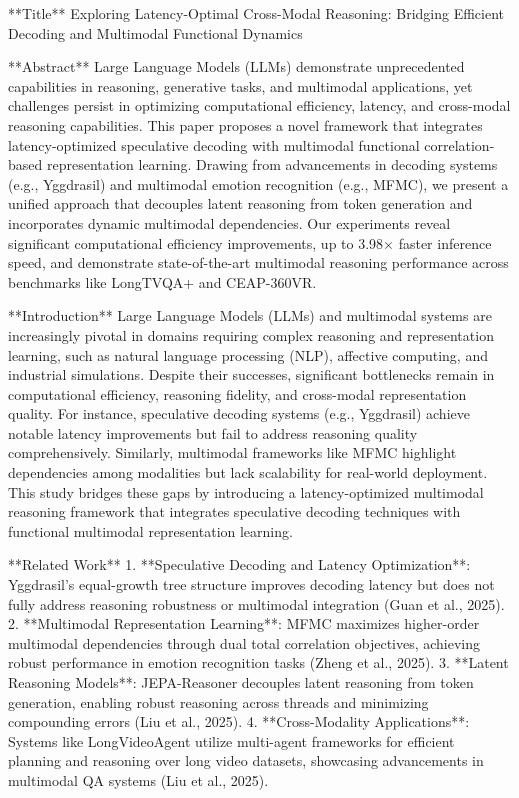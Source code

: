 **Title**  
Exploring Latency-Optimal Cross-Modal Reasoning: Bridging Efficient Decoding and Multimodal Functional Dynamics  

**Abstract**  
Large Language Models (LLMs) demonstrate unprecedented capabilities in reasoning, generative tasks, and multimodal applications, yet challenges persist in optimizing computational efficiency, latency, and cross-modal reasoning capabilities. This paper proposes a novel framework that integrates latency-optimized speculative decoding with multimodal functional correlation-based representation learning. Drawing from advancements in decoding systems (e.g., Yggdrasil) and multimodal emotion recognition (e.g., MFMC), we present a unified approach that decouples latent reasoning from token generation and incorporates dynamic multimodal dependencies. Our experiments reveal significant computational efficiency improvements, up to 3.98\(\times\) faster inference speed, and demonstrate state-of-the-art multimodal reasoning performance across benchmarks like LongTVQA+ and CEAP-360VR.

**Introduction**  
Large Language Models (LLMs) and multimodal systems are increasingly pivotal in domains requiring complex reasoning and representation learning, such as natural language processing (NLP), affective computing, and industrial simulations. Despite their successes, significant bottlenecks remain in computational efficiency, reasoning fidelity, and cross-modal representation quality. For instance, speculative decoding systems (e.g., Yggdrasil) achieve notable latency improvements but fail to address reasoning quality comprehensively. Similarly, multimodal frameworks like MFMC highlight dependencies among modalities but lack scalability for real-world deployment. This study bridges these gaps by introducing a latency-optimized multimodal reasoning framework that integrates speculative decoding techniques with functional multimodal representation learning.

**Related Work**  
1. **Speculative Decoding and Latency Optimization**: Yggdrasil's equal-growth tree structure improves decoding latency but does not fully address reasoning robustness or multimodal integration (Guan et al., 2025).  
2. **Multimodal Representation Learning**: MFMC maximizes higher-order multimodal dependencies through dual total correlation objectives, achieving robust performance in emotion recognition tasks (Zheng et al., 2025).  
3. **Latent Reasoning Models**: JEPA-Reasoner decouples latent reasoning from token generation, enabling robust reasoning across threads and minimizing compounding errors (Liu et al., 2025).  
4. **Cross-Modality Applications**: Systems like LongVideoAgent utilize multi-agent frameworks for efficient planning and reasoning over long video datasets, showcasing advancements in multimodal QA systems (Liu et al., 2025).  

